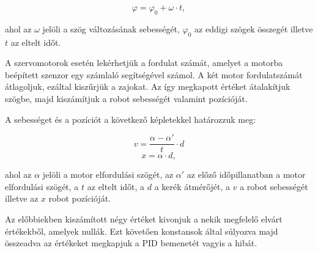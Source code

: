 \begin{equation} \label{szog}
\varphi=\varphi_{0}+\omega \cdot t,
\end{equation}

ahol az $\omega$ jelöli a szög változásának sebességét, $\varphi_{0}$ az eddigi szögek összegét illetve $t$ az eltelt időt.

A szervomotorok esetén lekérhetjük a fordulat számát, amelyet a motorba beépített szenzor egy számlaló segítségével számol. A két motor fordulatszámát átlagoljuk, ezáltal kiszűrjük a zajokat. Az így megkapott értéket átalakítjuk szögbe, majd kiszámítjuk a robot sebességét valamint pozícióját.

A sebességet és a pozíciót a következő képletekkel határozzuk meg:

\begin{equation} \label{sebesseg}
	v=\frac{\alpha-\alpha'}{t}\cdot d
\end{equation}
\begin{equation} \label{pozicio}
	x=\alpha\cdot d,
\end{equation}

ahol az $\alpha$ jelöli a motor elfordulási szögét, az $\alpha'$ az előző időpillanatban a motor elfordulási szögét, a $t$ az eltelt időt, a $d$ a kerék átmérőjét, a $v$ a robot sebességét illetve az $x$ robot pozícióját.

Az előbbiekben kiszámított négy értéket kivonjuk a nekik megfelelő elvárt értékekből, amelyek nullák. Ezt követően konstansok által súlyozva majd összeadva az értékeket megkapjuk a PID bemenetét vagyis a hibát.